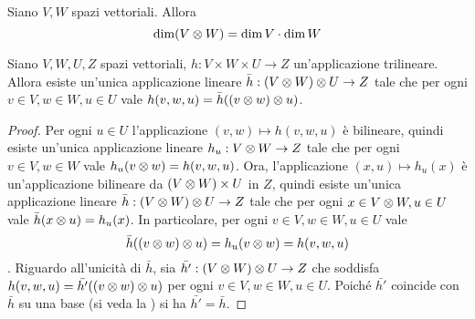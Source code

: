 \begin{corollary}
Siano $V\comma W$ spazi vettoriali. Allora
$$
\dim (V\otimes W)=\dim V\cdot\dim W
$$
\end{corollary}

\begin{proposition}
Siano $V\comma W\comma U\comma Z$ spazi vettoriali, $h:V\times W\times U\to Z$ un'applicazione trilineare. Allora esiste un'unica applicazione lineare $\bar h:(V\otimes W)\otimes U\to Z$ tale che per ogni $v\in V,w\in W,u\in U$ vale $h(v,w,u)=\bar h((v\otimes w)\otimes u)$.
\end{proposition}
\begin{proof}
Per ogni $u\in U$ l'applicazione $(v,w)\mapsto h(v,w,u)$ è bilineare, quindi esiste un'unica applicazione lineare $h_u:V\otimes W\to Z$ tale che per ogni $v\in V,w\in W$ vale $h_u(v\otimes w)=h(v,w,u)$. Ora, l'applicazione $(x,u)\mapsto h_u(x)$ è un'applicazione bilineare da $(V\otimes W)\times U$ in $Z$, quindi esiste un'unica applicazione lineare $\bar h:(V\otimes W)\otimes U\to Z$ tale che per ogni $x\in V\otimes W, u\in U$ vale $\bar h(x\otimes u)=h_u(x)$. In particolare, per ogni $v\in V,w\in W,u\in U$ vale
$$
\bar h((v\otimes w)\otimes u)=h_u(v\otimes w)=h(v,w,u)
$$
. Riguardo all'unicità di $\bar h$, sia $\bar{h'}:(V\otimes W)\otimes U\to Z$ che soddisfa $h(v,w,u)=\bar{h'}((v\otimes w)\otimes u)$ per ogni $v\in V,w\in W,u\in U$. Poiché $\bar{h'}$ coincide con $\bar h$ su una base (si veda la ) si ha $\bar{h'}=\bar h$.
\end{proof}



